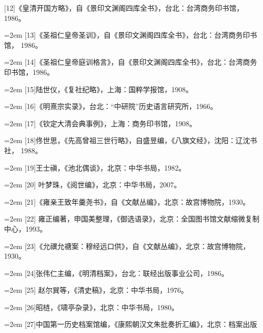 [12]《皇清开国方略》，自《景印文渊阁四库全书》，台北：台湾商务印书馆，%
1986。%
\par
\noindent\hangindent=2em
[13]《圣祖仁皇帝圣训》，自《景印文渊阁四库全书》，台北：台湾商务印书馆，%
1986。%
\par
\noindent\hangindent=2em
[14]《圣祖仁皇帝庭训格言》，自《景印文渊阁四库全书》，台北：台湾商务%
印书馆，1986。%
\par
\noindent\hangindent=2em
[15]陆世仪，《复社纪略》，上海：国粹学报馆，1908。%
\par
\noindent\hangindent=2em
[16]《明熹宗实录》，台北：“中研院”历史语言研究所，1966。%
\par
\noindent\hangindent=2em
[17]《钦定大清会典事例》，上海：商务印书馆，1908。%
\par
\noindent\hangindent=2em
[18]佟世思，《先高曾祖三世行略》，自盛昱编，《八旗文经》，沈阳：辽沈书社，%
1988。%
\par
\noindent\hangindent=2em
[19]王士禛，《池北偶谈》，北京：中华书局，1982。%
\par
\noindent\hangindent=2em
[20] 叶梦珠，《阅世编》，北京：中华书局，2007。%
\par
\noindent\hangindent=2em
[21]《雍亲王致年羹尧书》，自《文献丛编》，北京：故宫博物院，1930。%
\par
\noindent\hangindent=2em
[22] 雍正编著，申国美整理，《御选语录》，北京：全国图书馆文献缩微复制%
中心，1993。%
\par
\noindent\hangindent=2em
[23]《允禩允禟案：穆经远口供》，自《文献丛编》，北京：故宫博物院，1930。%
\par
\noindent\hangindent=2em
[24]张伟仁主编，《明清档案》，台北：联经出版事业公司，1986。%
\par
\noindent\hangindent=2em
[25] 赵尔巽等，《清史稿》，北京：中华书局，1976。%
\par
\noindent\hangindent=2em
[26]昭梿，《啸亭杂录》，北京：中华书局，1980。%
\par
\noindent\hangindent=2em
[27]中国第一历史档案馆编，《康熙朝汉文朱批奏折汇编》，北京：档案出版%
